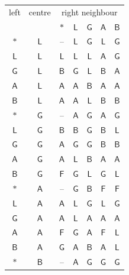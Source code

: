 \begin{table}[p]
\centering\small
\begin{tabular}{@{}cc|ccccc@{}}
\toprule
left & centre & \multicolumn{5}{c}{right neighbour}\\
 & & $\ast$ & $\mathsf{L}$ & $\mathsf{G}$ & $\mathsf{A}$ & $\mathsf{B}$\\
\midrule
$\ast$ & $\mathsf{L}$ & -- & $\mathsf{L}$ & $\mathsf{G}$ & $\mathsf{L}$ & $\mathsf{G}$\\
$\mathsf{L}$ & $\mathsf{L}$ & $\mathsf{L}$ & $\mathsf{L}$ & $\mathsf{L}$ & $\mathsf{A}$ & $\mathsf{G}$\\
$\mathsf{G}$ & $\mathsf{L}$ & $\mathsf{B}$ & $\mathsf{G}$ & $\mathsf{L}$ & $\mathsf{B}$ & $\mathsf{A}$\\
$\mathsf{A}$ & $\mathsf{L}$ & $\mathsf{A}$ & $\mathsf{A}$ & $\mathsf{B}$ & $\mathsf{A}$ & $\mathsf{A}$\\
$\mathsf{B}$ & $\mathsf{L}$ & $\mathsf{A}$ & $\mathsf{A}$ & $\mathsf{L}$ & $\mathsf{B}$ & $\mathsf{B}$\\
\midrule
$\ast$ & $\mathsf{G}$ & -- & $\mathsf{A}$ & $\mathsf{G}$ & $\mathsf{A}$ & $\mathsf{G}$\\
$\mathsf{L}$ & $\mathsf{G}$ & $\mathsf{B}$ & $\mathsf{B}$ & $\mathsf{G}$ & $\mathsf{B}$ & $\mathsf{L}$\\
$\mathsf{G}$ & $\mathsf{G}$ & $\mathsf{A}$ & $\mathsf{G}$ & $\mathsf{G}$ & $\mathsf{B}$ & $\mathsf{B}$\\
$\mathsf{A}$ & $\mathsf{G}$ & $\mathsf{A}$ & $\mathsf{L}$ & $\mathsf{B}$ & $\mathsf{A}$ & $\mathsf{A}$\\
$\mathsf{B}$ & $\mathsf{G}$ & $\mathsf{F}$ & $\mathsf{G}$ & $\mathsf{L}$ & $\mathsf{G}$ & $\mathsf{L}$\\
\midrule
$\ast$ & $\mathsf{A}$ & -- & $\mathsf{G}$ & $\mathsf{B}$ & $\mathsf{F}$ & $\mathsf{F}$\\
$\mathsf{L}$ & $\mathsf{A}$ & $\mathsf{A}$ & $\mathsf{L}$ & $\mathsf{G}$ & $\mathsf{L}$ & $\mathsf{G}$\\
$\mathsf{G}$ & $\mathsf{A}$ & $\mathsf{A}$ & $\mathsf{L}$ & $\mathsf{A}$ & $\mathsf{A}$ & $\mathsf{A}$\\
$\mathsf{A}$ & $\mathsf{A}$ & $\mathsf{F}$ & $\mathsf{G}$ & $\mathsf{A}$ & $\mathsf{F}$ & $\mathsf{L}$\\
$\mathsf{B}$ & $\mathsf{A}$ & $\mathsf{G}$ & $\mathsf{A}$ & $\mathsf{B}$ & $\mathsf{A}$ & $\mathsf{L}$\\
\midrule
$\ast$ & $\mathsf{B}$ & -- & $\mathsf{A}$ & $\mathsf{G}$ & $\mathsf{G}$ & $\mathsf{G}$\\

\end{tabular}
\end{table}
